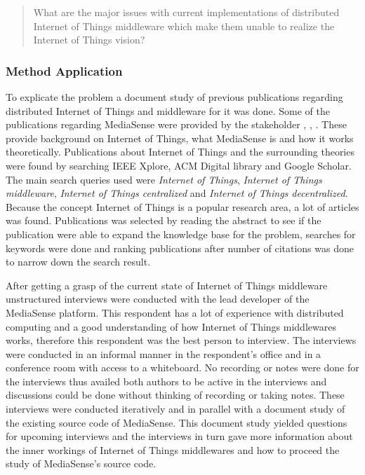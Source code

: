 \begin{quotation}
What are the major issues with current implementations of distributed Internet of Things middleware which make them unable to realize the Internet of Things vision?
\end{quotation}

\subsubsection{Method Application}
To explicate the problem a document study of previous publications regarding distributed Internet of Things and middleware for it was done. Some of the publications regarding MediaSense were provided by the stakeholder \cite{TheMediaSenseFramework}, \cite{Kanter539187}, \cite{Walters413794}. These provide background on Internet of Things, what MediaSense is and how it works theoretically. Publications about Internet of Things and the surrounding theories were found by searching IEEE Xplore, ACM Digital library and Google Scholar. The main search queries used were \emph{Internet of Things}, \emph{Internet of Things middleware}, \emph{Internet of Things centralized} and \emph{Internet of Things decentralized}. Because the concept Internet of Things is a popular research area, a lot of articles was found. Publications was selected by reading the abstract to see if the publication were able to expand the knowledge base for the problem, searches for keywords were done and ranking publications after number of citations was done to narrow down the search result. 

After getting a grasp of the current state of Internet of Things middleware unstructured interviews were conducted with the lead developer of the MediaSense platform. This respondent has a lot of experience with distributed computing and a good understanding of how Internet of Things middlewares works, therefore this respondent was the best person to interview. The interviews were conducted in an informal manner in the respondent's office and in a conference room with access to a whiteboard. No recording or notes were done for the interviews thus availed both authors to be active in the interviews and discussions could be done without thinking of recording or taking notes. These interviews were conducted iteratively and in parallel with a document study of the existing source code of MediaSense. This document study yielded questions for upcoming interviews and the interviews in turn gave more information about the inner workings of Internet of Things middlewares and how to proceed the study of MediaSense's source code.

